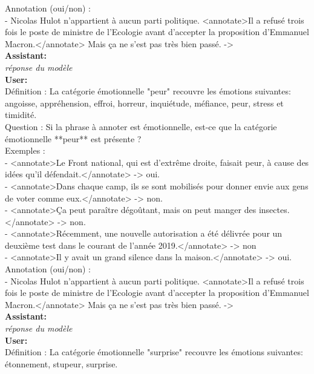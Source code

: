 {Annotation (oui/non) :\\
- Nicolas Hulot n’appartient à aucun parti politique. <annotate>Il a refusé trois fois le poste de ministre de l’Ecologie avant d’accepter la proposition d’Emmanuel Macron.</annotate> Mais ça ne s’est pas très bien passé.  -> \\

\textbf{Assistant:}\\
\textit{réponse du modèle}\\

\textbf{User:}\\
Définition : La catégorie émotionnelle "peur" recouvre les émotions suivantes: angoisse, appréhension, effroi, horreur, inquiétude, méfiance, peur, stress et timidité.\\

Question : Si la phrase à annoter est émotionnelle, est-ce que la catégorie émotionnelle **peur** est présente ?\\

Exemples :\\
- <annotate>Le Front national, qui est d'extrême droite, faisait peur, à cause des idées qu'il défendait.</annotate> -> oui.\\
- <annotate>Dans chaque camp, ils se sont mobilisés pour donner envie aux gens de voter comme eux.</annotate> -> non.\\
- <annotate>Ça peut paraître dégoûtant, mais on peut manger des insectes.</annotate> -> non.\\
- <annotate>Récemment, une nouvelle autorisation a été délivrée pour un deuxième test dans le courant de l'année 2019.</annotate> -> non\\
- <annotate>Il y avait un grand silence dans la maison.</annotate> -> oui.\\

Annotation (oui/non) :\\
- Nicolas Hulot n’appartient à aucun parti politique. <annotate>Il a refusé trois fois le poste de ministre de l’Ecologie avant d’accepter la proposition d’Emmanuel Macron.</annotate> Mais ça ne s’est pas très bien passé.  -> \\

\textbf{Assistant:}\\
\textit{réponse du modèle}\\

\textbf{User:}\\
Définition : La catégorie émotionnelle "surprise" recouvre les émotions suivantes: étonnement, stupeur, surprise.\\

}
